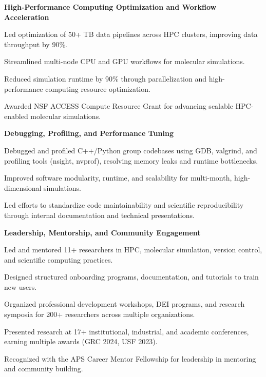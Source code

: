 \documentclass[letterpaper,12pt]{article}
\begin{document}
\vspace{0.5em}
\textbf{High-Performance Computing Optimization and Workflow Acceleration}
\begin{tabitemize}
    \item Led optimization of 50+ TB data pipelines across HPC clusters, improving data throughput by 90\%.
    \item Streamlined multi-node CPU and GPU workflows for molecular simulations.
    \item Reduced simulation runtime by 90\% through parallelization and high-performance computing resource optimization.
    \item Awarded NSF ACCESS Compute Resource Grant for advancing scalable HPC-enabled molecular simulations.
\end{tabitemize}

\vspace{0.5em}
\textbf{Debugging, Profiling, and Performance Tuning}
\begin{tabitemize}
    \item Debugged and profiled C++/Python group codebases using GDB, valgrind, and profiling tools (nsight, nvprof), resolving memory leaks and runtime bottlenecks.
    \item Improved software modularity, runtime, and scalability for multi-month, high-dimensional simulations.
    \item Led efforts to standardize code maintainability and scientific reproducibility through internal documentation and technical presentations.
\end{tabitemize}

\vspace{0.5em}
\textbf{Leadership, Mentorship, and Community Engagement}
\begin{tabitemize}
    \item Led and mentored 11+ researchers in HPC, molecular simulation, version control, and scientific computing practices.
    \item Designed structured onboarding programs, documentation, and tutorials to train new users.
    \item Organized professional development workshops, DEI programs, and research symposia for 200+ researchers across multiple organizations.
    \item Presented research at 17+ institutional, industrial, and academic conferences, earning multiple awards (GRC 2024, USF 2023).
    \item Recognized with the APS Career Mentor Fellowship for leadership in mentoring and community building.
\end{tabitemize}
\end{document}
